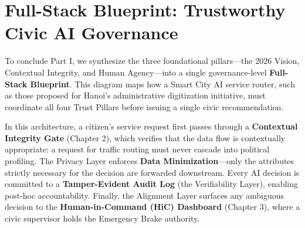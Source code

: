 \section{Full-Stack Blueprint: Trustworthy Civic AI Governance}
\label{sec:blueprint_civic_ai}

To conclude Part I, we synthesize the three foundational pillars---the 2026 Vision, Contextual Integrity, and Human Agency---into a single governance-level \textbf{Full-Stack Blueprint}. This diagram maps how a Smart City AI service router, such as those proposed for Hanoi's administrative digitization initiative, must coordinate all four Trust Pillars before issuing a single civic recommendation.

In this architecture, a citizen's service request first passes through a \textbf{Contextual Integrity Gate} (Chapter 2), which verifies that the data flow is contextually appropriate: a request for traffic routing must never cascade into political profiling. The Privacy Layer enforces \textbf{Data Minimization}---only the attributes strictly necessary for the decision are forwarded downstream. Every AI decision is committed to a \textbf{Tamper-Evident Audit Log} (the Verifiability Layer), enabling post-hoc accountability. Finally, the Alignment Layer surfaces any ambiguous decision to the \textbf{Human-in-Command (HiC) Dashboard} (Chapter 3), where a civic supervisor holds the Emergency Brake authority.

